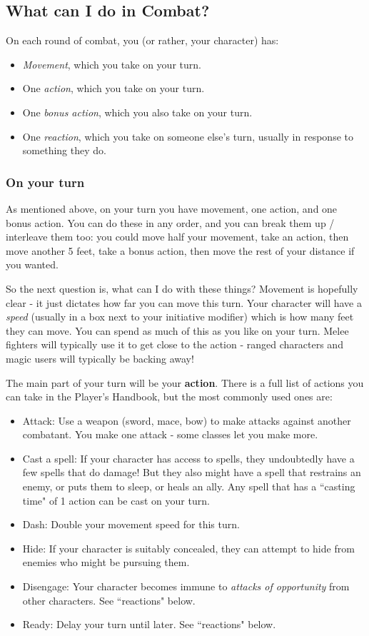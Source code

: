 \documentclass[10pt,a4paper]{article}
\begin{document}
\subsection{What can I do in Combat?}

On each round of combat, you (or rather, your character) has:
\begin{itemize}
    \item \emph{Movement}, which you take on your turn.
    \item One \emph{action}, which you take on your turn.
    \item One \emph{bonus action}, which you also take on your turn.
    \item One \emph{reaction}, which you take on someone else's turn, usually in response to something they do.
\end{itemize}

\subsubsection{On your turn}

As mentioned above, on your turn you have movement, one action, and one bonus action.
You can do these in any order, and you can break them up / interleave them too: you could move half your movement, take an action, then move another 5 feet, take a bonus action, then move the rest of your distance if you wanted.

So the next question is, what can I do with these things?
Movement is hopefully clear - it just dictates how far you can move this turn.
Your character will have a \emph{speed} (usually in a box next to your initiative modifier) which is how many feet they can move.
You can spend as much of this as you like on your turn.
Melee fighters will typically use it to get close to the action - ranged characters and magic users will typically be backing away!

The main part of your turn will be your \textbf{action}.
There is a full list of actions you can take in the Player's Handbook, but the most commonly used ones are:
\begin{itemize}
    \item Attack: Use a weapon (sword, mace, bow) to make attacks against another combatant. You make one attack - some classes let you make more.
    \item Cast a spell: If your character has access to spells, they undoubtedly have a few spells that do damage! But they also might have a spell that restrains an enemy, or puts them to sleep, or heals an ally. Any spell that has a ``casting time" of 1 action can be cast on your turn.
    \item Dash: Double your movement speed for this turn.
    \item Hide: If your character is suitably concealed, they can attempt to hide from enemies who might be pursuing them.
    \item Disengage: Your character becomes immune to \emph{attacks of opportunity} from other characters. See ``reactions" below.
    \item Ready: Delay your turn until later. See ``reactions" below.
\end{itemize}
\end{document}
